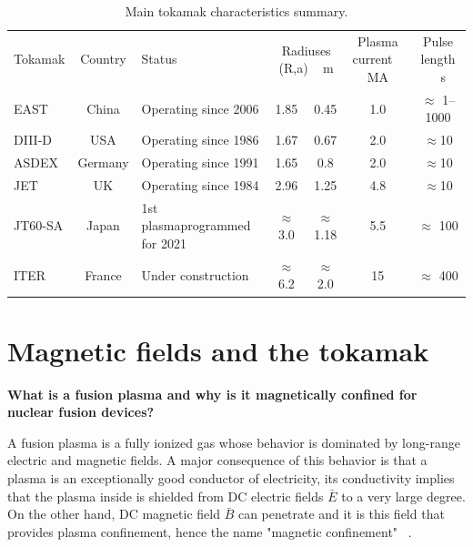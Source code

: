 \begin{table}[]
	\centering
	\begin{tabular}{|l|c|p{25mm}|c|c|c|c|}
		\hline
		\rowcolor{color2}
		\multicolumn{7}{|c|}{\textbf{Tokamak }}                                                                 \\ \hline
		\rowcolor{color1}
		Tokamak  & Country               & Status & \multicolumn{2}{c|}{Radiuses (R,a) ~ m}   & Plasma current ~ MA    & Pulse length ~ s          \\ \hline
		EAST                  & China               & Operating  since 2006              &  1.85& 0.45 & 	1.0  &  $\approx$ 1–1000\\ \hline
		 DIII-D                  & USA               & Operating since 1986                      & 	1.67 & 0.67 &  2.0  & $\approx$10 \\ \hline
				ASDEX                  & Germany               & Operating since 1991                      & 	1.65 & 0.8 &  2.0  & $\approx$10 \\ \hline

JET                 & UK               & Operating since 1984                & 2.96  & 1.25 & 4.8 & $\approx$10 \\ \hline
JT60-SA                  & Japan              & 1st plasma\newline programmed for 2021                & $\approx$ 3.0 & $\approx$ 1.18 & 5.5  & $\approx$ 100 \\ \hline
ITER                  & France               & Under construction                & $\approx$ 6.2 & $\approx$ 2.0 & 15 & $\approx$ 400  \\ \hline
	\end{tabular}
	\caption{ Main tokamak characteristics summary.}
	\label{Tokamak_table}
\end{table}


\section{Magnetic fields and the tokamak}

\textbf{What is a fusion plasma and why is it magnetically confined for nuclear fusion devices?}

A fusion plasma is a fully ionized gas whose behavior is dominated by long-range electric and magnetic fields. A major consequence of this behavior is that a plasma is an exceptionally good conductor of electricity, its conductivity implies that the plasma inside is shielded from DC electric fields $\bar{E}$ to a very large degree. On the other hand, DC magnetic field $\bar{B}$ can penetrate and it is this field that provides plasma confinement, hence the name "magnetic confinement" ~\cite[Chapter~6]{Freidberg2007}.\smallskip

